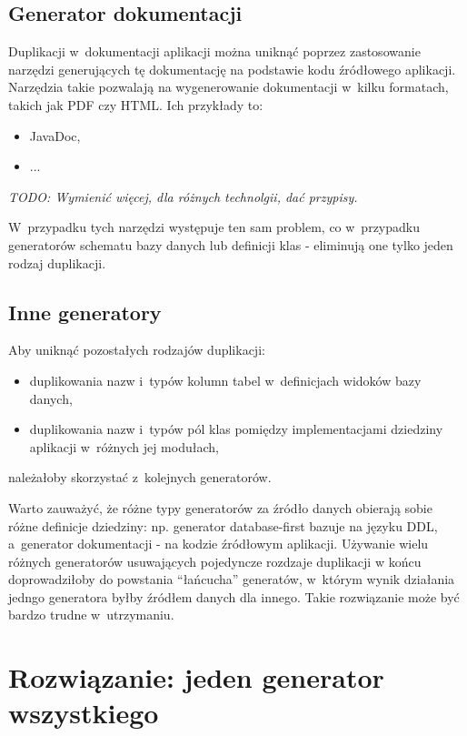 \subsection{Generator dokumentacji}

Duplikacji w~dokumentacji aplikacji można uniknąć poprzez zastosowanie narzędzi generujących tę dokumentację na podstawie kodu źródłowego aplikacji.
Narzędzia takie pozwalają na wygenerowanie dokumentacji w~kilku formatach, takich jak PDF czy HTML.
Ich przykłady to:

\begin{itemize}
 \item JavaDoc,
 \item ...
\end{itemize}

\emph{TODO: Wymienić więcej, dla różnych technolgii, dać przypisy.}

W~przypadku tych narzędzi występuje ten sam problem, co w~przypadku generatorów schematu bazy danych lub definicji klas - eliminują one tylko jeden rodzaj duplikacji.


\subsection{Inne generatory}

Aby uniknąć pozostałych rodzajów duplikacji:

\begin{itemize}
 \item duplikowania nazw i~typów kolumn tabel w~definicjach widoków bazy danych,
 \item duplikowania nazw i~typów pól klas pomiędzy implementacjami dziedziny aplikacji w~różnych jej modułach,
\end{itemize}

należałoby skorzystać z~kolejnych generatorów.

Warto zauważyć, że różne typy generatorów za źródło danych obierają sobie różne definicje dziedziny: np. generator database-first bazuje na języku DDL, a~generator dokumentacji - na kodzie źródłowym aplikacji.
Używanie wielu różnych generatorów usuwających pojedyncze rozdzaje duplikacji w końcu doprowadziłoby do powstania ``łańcucha'' generatów, w~którym wynik działania jedngo generatora byłby źródłem danych dla innego.
Takie rozwiązanie może być bardzo trudne w~utrzymaniu.



\section{Rozwiązanie: jeden generator wszystkiego}

